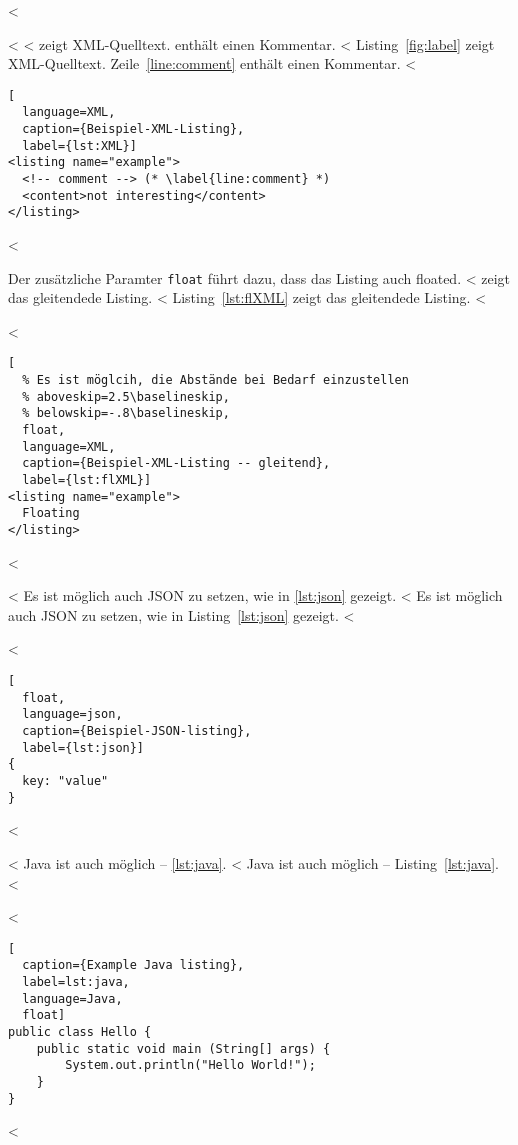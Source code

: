<%

<%
<%
 zeigt XML-Quelltext.
 enthält einen Kommentar.
<%
Listing~\ref{fig:label} zeigt XML-Quelltext.
Zeile~\ref{line:comment} enthält einen Kommentar.
<%

\begin{lstlisting}[
  language=XML,
  caption={Beispiel-XML-Listing},
  label={lst:XML}]
<listing name="example">
  <!-- comment --> (* \label{line:comment} *)
  <content>not interesting</content>
</listing>
\end{lstlisting}
<%

Der zusätzliche Paramter \verb+float+ führt dazu, dass das Listing auch floated.
<%
 zeigt das gleitendede Listing.
<%
Listing~\ref{lst:flXML} zeigt das gleitendede Listing.
<%

<%
\begin{lstlisting}[
  % Es ist möglcih, die Abstände bei Bedarf einzustellen
  % aboveskip=2.5\baselineskip,
  % belowskip=-.8\baselineskip,
  float,
  language=XML,
  caption={Beispiel-XML-Listing -- gleitend},
  label={lst:flXML}]
<listing name="example">
  Floating
</listing>
\end{lstlisting}
<%

<%
Es ist möglich auch JSON zu setzen, wie in \cref{lst:json} gezeigt.
<%
Es ist möglich auch JSON zu setzen, wie in Listing~\ref{lst:json} gezeigt.
<%

<%
\begin{lstlisting}[
  float,
  language=json,
  caption={Beispiel-JSON-listing},
  label={lst:json}]
{
  key: "value"
}
\end{lstlisting}
<%

<%
Java ist auch möglich -- \cref{lst:java}.
<%
Java ist auch möglich -- Listing~\ref{lst:java}.
<%

<%
\begin{lstlisting}[
  caption={Example Java listing},
  label=lst:java,
  language=Java,
  float]
public class Hello {
    public static void main (String[] args) {
        System.out.println("Hello World!");
    }
}
\end{lstlisting}
<%
